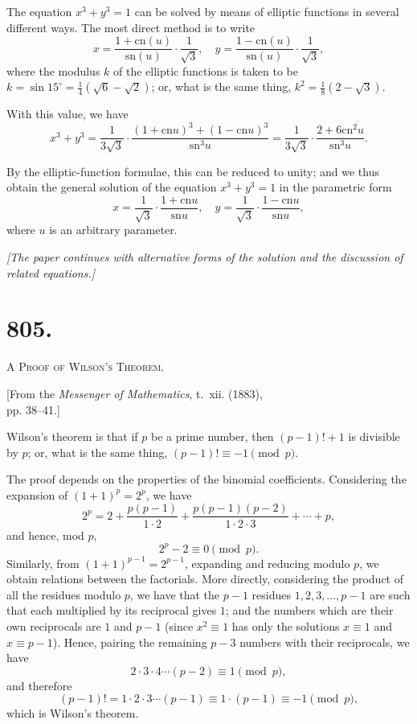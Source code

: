 \documentclass[11pt,a4paper]{book}
\providecommand{\sn}{\mathrm{sn}}
\providecommand{\cn}{\mathrm{cn}}
\begin{document}
The equation $x^3 + y^3 = 1$ can be solved by means of elliptic functions in several different ways. The most direct method is to write
\[
x = \frac{1 + \cn(u)}{\sn(u)} \cdot \frac{1}{\sqrt{3}}, \quad y = \frac{1 - \cn(u)}{\sn(u)} \cdot \frac{1}{\sqrt{3}},
\]
where the modulus $k$ of the elliptic functions is taken to be $k = \sin 15^\circ = \frac{1}{4}(\sqrt{6} - \sqrt{2})$; or, what is the same thing, $k^2 = \frac{1}{8}(2 - \sqrt{3})$.

With this value, we have
\[
x^3 + y^3 = \frac{1}{3\sqrt{3}} \cdot \frac{(1 + \cn u)^3 + (1 - \cn u)^3}{\sn^3 u} = \frac{1}{3\sqrt{3}} \cdot \frac{2 + 6\cn^2 u}{\sn^3 u}.
\]

By the elliptic-function formulae, this can be reduced to unity; and we thus obtain the general solution of the equation $x^3 + y^3 = 1$ in the parametric form
\[
x = \frac{1}{\sqrt{3}} \cdot \frac{1 + \cn u}{\sn u}, \quad y = \frac{1}{\sqrt{3}} \cdot \frac{1 - \cn u}{\sn u},
\]
where $u$ is an arbitrary parameter.

\vspace{0.5cm}
\noindent\textit{[The paper continues with alternative forms of the solution and the discussion of related equations.]}
\vspace{0.5cm}



\newpage
\section*{805.}
\begin{center}
{\large\scshape A Proof of Wilson's Theorem.}
\end{center}

\begin{flushright}
\small[From the \textit{Messenger of Mathematics}, t.~xii. (1883),\\
pp. 38--41.]
\end{flushright}

Wilson's theorem is that if $p$ be a prime number, then $(p-1)! + 1$ is divisible by $p$; or, what is the same thing, $(p-1)! \equiv -1 \pmod{p}$.

The proof depends on the properties of the binomial coefficients. Considering the expansion of $(1 + 1)^p = 2^p$, we have
\[
2^p = 2 + \frac{p(p-1)}{1 \cdot 2} + \frac{p(p-1)(p-2)}{1 \cdot 2 \cdot 3} + \cdots + p,
\]
and hence, mod $p$,
\[
2^p - 2 \equiv 0 \pmod{p}.
\]
Similarly, from $(1 + 1)^{p-1} = 2^{p-1}$, expanding and reducing modulo $p$, we obtain relations between the factorials. More directly, considering the product of all the residues modulo $p$, we have that the $p-1$ residues $1, 2, 3, \ldots, p-1$ are such that each multiplied by its reciprocal gives $1$; and the numbers which are their own reciprocals are $1$ and $p-1$ (since $x^2 \equiv 1$ has only the solutions $x \equiv 1$ and $x \equiv p-1$). Hence, pairing the remaining $p-3$ numbers with their reciprocals, we have
\[
2 \cdot 3 \cdot 4 \cdots (p-2) \equiv 1 \pmod{p},
\]
and therefore
\[
(p-1)! = 1 \cdot 2 \cdot 3 \cdots (p-1) \equiv 1 \cdot (p-1) \equiv -1 \pmod{p},
\]
which is Wilson's theorem.
\end{document}
